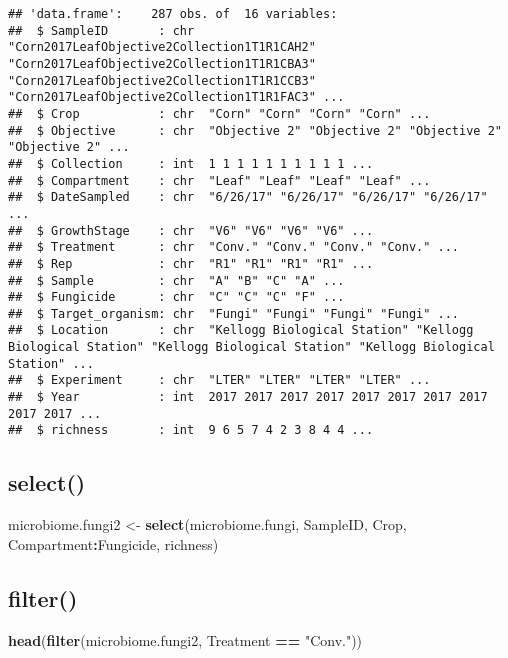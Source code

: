 \documentclass[
]{article}
\newenvironment{Shaded}{\begin{snugshade}}{\end{snugshade}}
\newcommand{\FunctionTok}[1]{\textcolor[rgb]{0.13,0.29,0.53}{\textbf{#1}}}
\newcommand{\NormalTok}[1]{#1}
\newcommand{\OtherTok}[1]{\textcolor[rgb]{0.56,0.35,0.01}{#1}}
\newcommand{\SpecialCharTok}[1]{\textcolor[rgb]{0.81,0.36,0.00}{\textbf{#1}}}
\newcommand{\StringTok}[1]{\textcolor[rgb]{0.31,0.60,0.02}{#1}}
\begin{document}
\begin{verbatim}
## 'data.frame':    287 obs. of  16 variables:
##  $ SampleID       : chr  "Corn2017LeafObjective2Collection1T1R1CAH2" "Corn2017LeafObjective2Collection1T1R1CBA3" "Corn2017LeafObjective2Collection1T1R1CCB3" "Corn2017LeafObjective2Collection1T1R1FAC3" ...
##  $ Crop           : chr  "Corn" "Corn" "Corn" "Corn" ...
##  $ Objective      : chr  "Objective 2" "Objective 2" "Objective 2" "Objective 2" ...
##  $ Collection     : int  1 1 1 1 1 1 1 1 1 1 ...
##  $ Compartment    : chr  "Leaf" "Leaf" "Leaf" "Leaf" ...
##  $ DateSampled    : chr  "6/26/17" "6/26/17" "6/26/17" "6/26/17" ...
##  $ GrowthStage    : chr  "V6" "V6" "V6" "V6" ...
##  $ Treatment      : chr  "Conv." "Conv." "Conv." "Conv." ...
##  $ Rep            : chr  "R1" "R1" "R1" "R1" ...
##  $ Sample         : chr  "A" "B" "C" "A" ...
##  $ Fungicide      : chr  "C" "C" "C" "F" ...
##  $ Target_organism: chr  "Fungi" "Fungi" "Fungi" "Fungi" ...
##  $ Location       : chr  "Kellogg Biological Station" "Kellogg Biological Station" "Kellogg Biological Station" "Kellogg Biological Station" ...
##  $ Experiment     : chr  "LTER" "LTER" "LTER" "LTER" ...
##  $ Year           : int  2017 2017 2017 2017 2017 2017 2017 2017 2017 2017 ...
##  $ richness       : int  9 6 5 7 4 2 3 8 4 4 ...
\end{verbatim}

\subsection{select()}\label{select}

\begin{Shaded}
\begin{Highlighting}[]
\NormalTok{microbiome.fungi2 }\OtherTok{\textless{}{-}} \FunctionTok{select}\NormalTok{(microbiome.fungi, SampleID, Crop, Compartment}\SpecialCharTok{:}\NormalTok{Fungicide, richness)}
\end{Highlighting}
\end{Shaded}

\subsection{filter()}\label{filter}

\begin{Shaded}
\begin{Highlighting}[]
\FunctionTok{head}\NormalTok{(}\FunctionTok{filter}\NormalTok{(microbiome.fungi2, Treatment }\SpecialCharTok{==} \StringTok{"Conv."}\NormalTok{))}
\end{Highlighting}
\end{Shaded}
\end{document}
